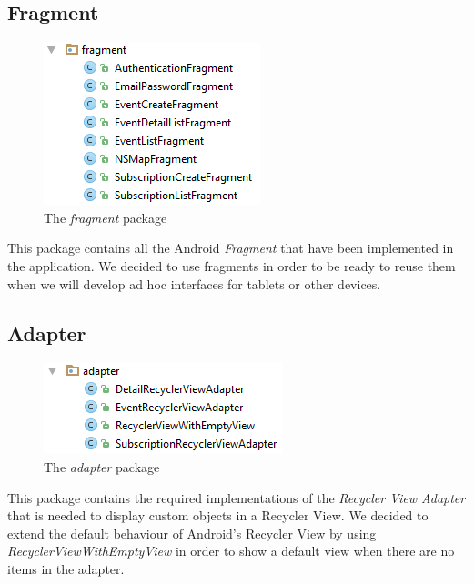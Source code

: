 \documentclass[a4paper]{scrreprt}
\begin{document}
\subsection{Fragment}
\begin{figure}[H]
	\centering
	\includegraphics{pack_fragment}
	\caption{The \emph{fragment} package}
\end{figure}
This package contains all the Android \emph{Fragment} that have been implemented in the application. We decided to use fragments in order to be ready to reuse them when we will develop ad hoc interfaces for tablets or other devices.

\subsection{Adapter}
\begin{figure}[H]
	\centering
	\includegraphics{pack_adapter}
	\caption{The \emph{adapter} package}
\end{figure}
This package contains the required implementations of the \emph{Recycler View Adapter} that is needed to display custom objects in a Recycler View. We decided to extend the default behaviour of Android's Recycler View by using \emph{RecyclerViewWithEmptyView} in order to show a default view when there are no items in the adapter.
\end{document}
